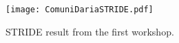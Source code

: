 
%

\begin{figure}
    \centering
    \texttt{[image: ComuniDariaSTRIDE.pdf]}
    \caption{STRIDE result from the first workshop.}
    \label{fig:stride_workshop1}
\end{figure}

